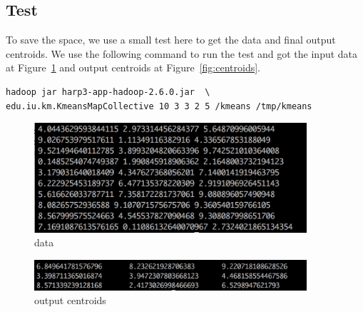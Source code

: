 \documentclass[paper=letter, fontsize=12pt]{article}
\begin{document}
 
\subsection{Test}
 
To save the space, we use a small test here to get the data and final output centroids. We use the following command to run the test and got the input data at Figure~\ref{fig:data} and output centroids at Figure~\ref{fig:centroids}.\\
 
 \begin{lstlisting}
hadoop jar harp3-app-hadoop-2.6.0.jar  \
edu.iu.km.KmeansMapCollective 10 3 3 2 5 /kmeans /tmp/kmeans
 \end{lstlisting}
 
 \begin{figure}[H]  
\centering
\includegraphics[width=0.9\textwidth]{data}
\caption{data}
\label{fig:data}
\end{figure}
 
 
\begin{figure}[H]  
\centering
\includegraphics[width=0.9\textwidth]{centroids}
\caption{output centroids}
\label{fig: output centroids}
\end{figure}
 


 


\end{document}
